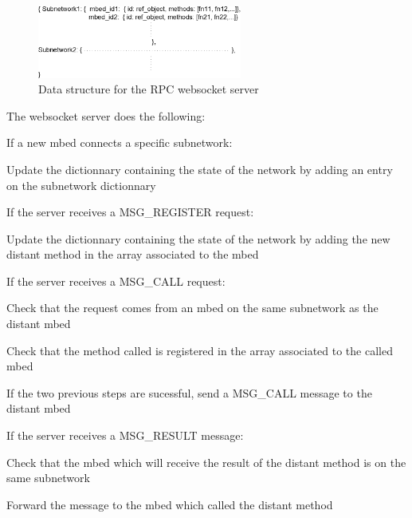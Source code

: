 \documentclass[pdftex,10pt,a4paper]{report}
\newenvironment{packed_item}{
\begin{itemize}
  \setlength{\itemsep}{1pt}
  \setlength{\parskip}{0pt}
  \setlength{\parsep}{0pt}
}{\end{itemize}}
\begin{document}
\begin{figure}[h!]
		\centering
		\includegraphics[width=0.6\textwidth]{./rpc_server_data_struct.png}
		\caption{Data structure for the RPC websocket server}
		\label{Data structure for the RPC websocket server}
\end{figure}


The websocket server does the following:
\begin{packed_item}
	\item If a new mbed connects a specific subnetwork:
	\begin{packed_item}
		\item Update the dictionnary containing the state of the network by adding an entry on the subnetwork dictionnary
	\end{packed_item}
	
	\item If the server receives a MSG\_REGISTER request:
	\begin{packed_item}
		\item Update the dictionnary containing the state of the network by adding the new distant method in the array associated to the mbed
	\end{packed_item}
	
	\item If the server receives a MSG\_CALL request:
	\begin{packed_item}
		\item Check that the request comes from an mbed on the same subnetwork as the distant mbed
		\item Check that the method called is registered in the array associated to the called mbed
		\item If the two previous steps are sucessful, send a MSG\_CALL message to the distant mbed
	\end{packed_item}
	
	\item If the server receives a MSG\_RESULT message:
	\begin{packed_item}
		\item Check that the mbed which will receive the result of the distant method is on the same subnetwork
		\item Forward the message to the mbed which called the distant method
	\end{packed_item}
	
\end{packed_item}
	
\end{document}
